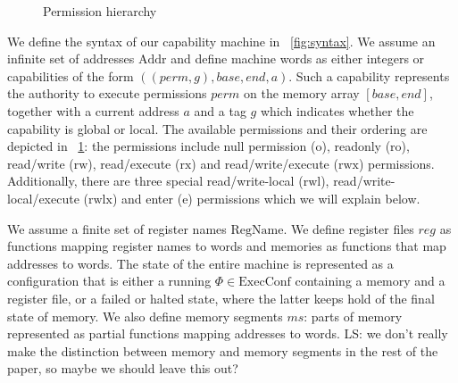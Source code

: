 \documentclass[compsoc,conference,letterpaper,fleqn]{IEEEtran}
\newcommand\lau[1]{{\color{purple} \sf \footnotesize {LS: #1}}\\}
\newcommand{\var}[1]{\mathit{#1}}
\newcommand{\hs}{\var{ms}}
\newcommand{\ms}{\hs}
\newcommand{\gl}{\var{g}}
\newcommand{\addr}{\var{a}}
\newcommand{\start}{\var{base}}
\newcommand{\addrend}{\var{end}}
\newcommand{\reg}{\var{reg}}
\newcommand{\perm}{\var{perm}}
\newcommand{\plaindom}[1]{\mathrm{#1}}
\newcommand{\Addrs}{\plaindom{Addr}}
\newcommand{\ExecConfs}{\plaindom{ExecConf}}
\newcommand{\RegName}{\plaindom{RegName}}
\newcommand{\plainperm}[1]{\mathrm{#1}}
\newcommand{\noperm}{\plainperm{o}}
\newcommand{\readonly}{\plainperm{ro}}
\newcommand{\readwrite}{\plainperm{rw}}
\newcommand{\exec}{\plainperm{rx}}
\newcommand{\entry}{\plainperm{e}}
\newcommand{\rwx}{\plainperm{rwx}}
\newcommand{\readwritel}{\plainperm{rwl}}
\newcommand{\rwlx}{\plainperm{rwlx}}
\begin{document}
\begin{figure}
  \centering

  \caption{Permission hierarchy}
  \label{fig:perm-hier}
\end{figure}

We define the syntax of our capability machine in \figurename~\ref{fig:syntax}. We
assume an infinite set of addresses $\Addrs$ and define machine words as either
integers or capabilities of the form $((\perm,\gl),\start,\addrend,\addr)$. Such
a capability represents the authority to execute permissions $\perm$ on the
memory array $[\start,\addrend]$, together with a current address $\addr$ and a
tag $\gl$ which indicates whether the capability is global or local. The
available permissions and their ordering are depicted in
\figurename~\ref{fig:perm-hier}: the permissions include null permission ($\noperm$),
readonly ($\readonly$), read/write ($\readwrite$), read/execute ($\exec$) and
read/write/execute ($\rwx$) permissions. Additionally, there are three special
read/write-local ($\readwritel$), read/write-local/execute ($\rwlx$) and enter
($\entry$) permissions which we will explain below.

We assume a finite set of register names $\RegName$. We define register files $\reg$ as
functions mapping register names to words and memories as functions that map
addresses to words. The state of the entire machine is represented as a
configuration that is either a running $\Phi \in \ExecConfs$ containing a memory
and a register file, or a failed or halted state, where the latter keeps hold
of the final state of memory. We also define memory segments $\ms$:
parts of memory represented as partial functions mapping addresses to words. \lau{we don't really make the distinction between memory and memory segments in the rest of the paper, so maybe we should leave this out?}
\end{document}

